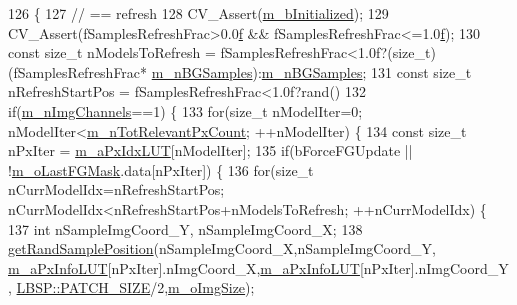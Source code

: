 \begin{DoxyCode}
126                                                                                              \{
127     \textcolor{comment}{// == refresh}
128     CV\_Assert(\mbox{\hyperlink{class_background_subtractor_l_b_s_p_a55cea104a0924fd50d5bed0912828a7e}{m\_bInitialized}});
129     CV\_Assert(fSamplesRefreshFrac>0.0\mbox{\hyperlink{rings_8cpp_a77369fc4d5326a16d2c603e032023528}{f}} && fSamplesRefreshFrac<=1.0\mbox{\hyperlink{rings_8cpp_a77369fc4d5326a16d2c603e032023528}{f}});
130     \textcolor{keyword}{const} \textcolor{keywordtype}{size\_t} nModelsToRefresh = fSamplesRefreshFrac<1.0f?(size\_t)(fSamplesRefreshFrac*
      \mbox{\hyperlink{class_background_subtractor_l_o_b_s_t_e_r_a20c53540b952d608d849a305fd5eed89}{m\_nBGSamples}}):\mbox{\hyperlink{class_background_subtractor_l_o_b_s_t_e_r_a20c53540b952d608d849a305fd5eed89}{m\_nBGSamples}};
131     \textcolor{keyword}{const} \textcolor{keywordtype}{size\_t} nRefreshStartPos = fSamplesRefreshFrac<1.0f?rand()%
132     \textcolor{keywordflow}{if}(\mbox{\hyperlink{class_background_subtractor_l_b_s_p_ab3467ebee2c5d1249061ccd704cc0584}{m\_nImgChannels}}==1) \{
133         \textcolor{keywordflow}{for}(\textcolor{keywordtype}{size\_t} nModelIter=0; nModelIter<\mbox{\hyperlink{class_background_subtractor_l_b_s_p_ac3b54f4d2dfa3a576475214f26501d85}{m\_nTotRelevantPxCount}}; ++nModelIter) \{
134             \textcolor{keyword}{const} \textcolor{keywordtype}{size\_t} nPxIter = \mbox{\hyperlink{class_background_subtractor_l_b_s_p_a06b4f0d3f24fa08bccd3c9eca085713e}{m\_aPxIdxLUT}}[nModelIter];
135             \textcolor{keywordflow}{if}(bForceFGUpdate || !\mbox{\hyperlink{class_background_subtractor_l_b_s_p_adb6dc0af596c5592c91f9d8faa5c8a4b}{m\_oLastFGMask}}.data[nPxIter]) \{
136                 \textcolor{keywordflow}{for}(\textcolor{keywordtype}{size\_t} nCurrModelIdx=nRefreshStartPos; nCurrModelIdx<nRefreshStartPos+nModelsToRefresh;
       ++nCurrModelIdx) \{
137                     \textcolor{keywordtype}{int} nSampleImgCoord\_Y, nSampleImgCoord\_X;
138                     \mbox{\hyperlink{_rand_utils_8h_aad1feb1fa9a8e94c8fac60b9a01e1a5b}{getRandSamplePosition}}(nSampleImgCoord\_X,nSampleImgCoord\_Y,
      \mbox{\hyperlink{class_background_subtractor_l_b_s_p_a74e73d4832ccdef652d93756582024db}{m\_aPxInfoLUT}}[nPxIter].nImgCoord\_X,\mbox{\hyperlink{class_background_subtractor_l_b_s_p_a74e73d4832ccdef652d93756582024db}{m\_aPxInfoLUT}}[nPxIter].nImgCoord\_Y,
      \mbox{\hyperlink{class_l_b_s_p_aa98abb79a155d3a2b416c2ab32e74929}{LBSP::PATCH\_SIZE}}/2,\mbox{\hyperlink{class_background_subtractor_l_b_s_p_a732d5e6ae35fb0e858cadb3af5ce08a2}{m\_oImgSize}});

\end{DoxyCode}

